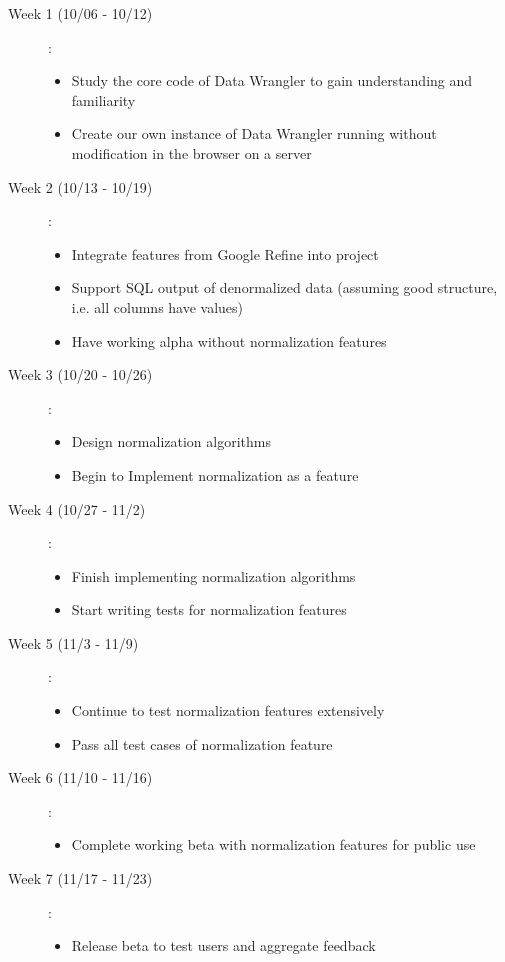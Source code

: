 \documentclass{../sty/acm_proc_article-sp}
\begin{document}
\begin{description}
\item[Week 1 (10/06 - 10/12)]:
	\begin{itemize}
		\item Study the core code of Data Wrangler to gain understanding and familiarity
		\item Create our own instance of Data Wrangler running without modification in the browser on a server
	\end{itemize}
\item[Week 2 (10/13 - 10/19)]:
	\begin{itemize}
		\item Integrate features from Google Refine into project
		\item Support SQL output of denormalized data (assuming good structure, i.e. all columns have values)
		\item Have working alpha without normalization features
	\end{itemize}
\item[Week 3 (10/20 - 10/26)]:
	\begin{itemize}
		\item Design normalization algorithms
		\item Begin to Implement normalization as a feature
	\end{itemize}
\item[Week 4 (10/27 - 11/2)]:
	\begin{itemize}
		\item Finish implementing normalization algorithms
		\item Start writing tests for normalization features
	\end{itemize}
\item[Week 5 (11/3 - 11/9)]:
	\begin{itemize}
		\item Continue to test normalization features extensively
		\item Pass all test cases of normalization feature
	\end{itemize}
\item[Week 6 (11/10 - 11/16)]:
	\begin{itemize}
		\item Complete working beta with normalization features for public use
	\end{itemize}
\item[Week 7 (11/17 - 11/23)]:
	\begin{itemize}
		\item Release beta to test users and aggregate feedback

\end{itemize}
\end{description}
\end{document}
